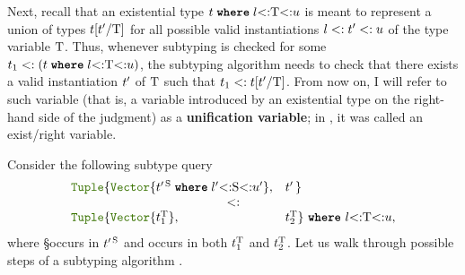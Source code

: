 Next, recall that an existential type $t\;\textbf{\texttt{where}}\;l{<:}\mathrm{T}{<:}u$ is meant to 
represent a union of types $t[t'/\mathrm{T}]$ for all possible valid instantiations
$l <:t' <: u$ of the type variable $\mathrm{T}$.
Thus, whenever subtyping is checked for some 
$t_1 <: (t\;\textbf{\texttt{where}}\;l{<:}\mathrm{T}{<:}u)$, the subtyping algorithm needs to check that
there exists a valid instantiation $t'$ of $\mathrm{T}$ such that $t_1 <: t[t'/\mathrm{T}]$.
From now on, I will refer to such variable \T (that is, a variable introduced
by an existential type on the right-hand side of the judgment) as a
\textbf{unification variable}; in ,
it was called an exist/right variable.

Consider the following subtype query 
\[
  \begin{array}{ll}
    \jlname{Tuple}\{\vectyp{\wheret{\t'^{\,\S}}{l'{<:}\S{<:}u'}}, &
      t'\,\}\\
    \multicolumn{2}{c}{<:} \\
    \jlname{Tuple}\{\vectyp{t_1^{\T}}, & t_2^{\T}\} 
      \ \textbf{\texttt{where}}\ l{<:}\T{<:}u,
  \end{array}
\]
where \S occurs in $t'^{\,\mathrm{S}}$ and \T occurs in both $t_1^{\mathrm{T}}$ and $t_2^{\mathrm{T}}$.
Let us walk through possible steps of a subtyping algorithm \algo.
